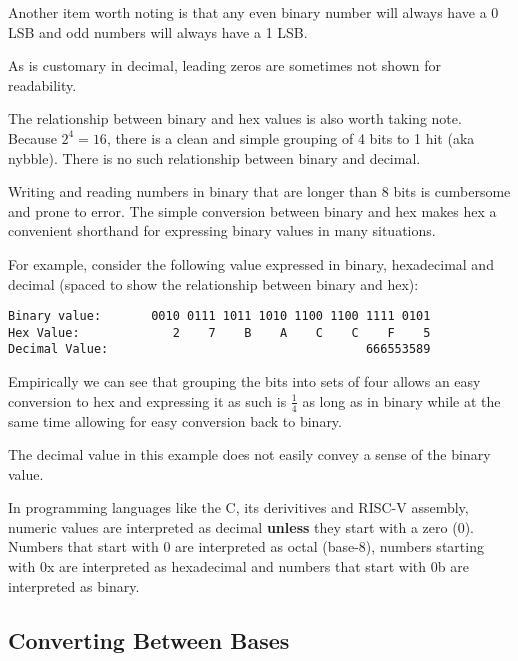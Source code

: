 Another item worth noting is that any even binary number will always
have a 0 LSB and odd numbers will always have a 1 LSB.

As is customary in decimal, leading zeros are sometimes not shown 
for readability.

The relationship between binary and hex values is also worth taking
note.  Because $2^4 = 16$, there is a clean and simple grouping
of 4 \gls{bit}s to 1 \gls{hit} (aka \gls{nybble}).  
There is no such relationship between binary and decimal.  

Writing and reading numbers in binary that are longer than 8 bits 
is cumbersome and prone to error.  The simple conversion between 
binary and hex makes hex a convenient shorthand for expressing 
binary values in many situations.  

For example, consider the following value expressed in binary, 
hexadecimal and decimal (spaced to show the relationship
between binary and hex):

\begin{verbatim}
Binary value:       0010 0111 1011 1010 1100 1100 1111 0101
Hex Value:             2    7    B    A    C    C    F    5
Decimal Value:                                    666553589
\end{verbatim}

Empirically we can see that grouping the bits into sets of four
allows an easy conversion to hex and expressing it as such is
$\frac{1}{4}$ as long as in binary while at the same time
allowing for easy conversion back to binary.

The decimal value in this example does not easily convey a sense
of the binary value.

\begin{tcolorbox}
In programming languages like the C, its derivitives and RISC-V 
assembly, numeric values are interpreted as decimal {\bfseries unless} 
they start with a zero (0).  
Numbers that start with 0 are interpreted as octal (base-8), 
numbers starting with 0x are interpreted as hexadecimal and 
numbers that start with 0b are interpreted as binary.
\end{tcolorbox}

\subsection{Converting Between Bases}

